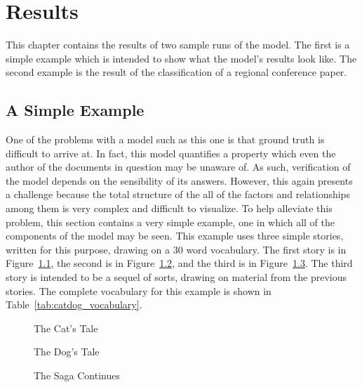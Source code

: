 \documentclass[../ut-dissertation.tex]{subfiles}
\begin{document}
\chapter{Results}
This chapter contains the results of two sample runs of the model.
The first is a simple example which is intended to show what the
model's results look like.  The second example is the result of the
classification of a regional conference paper.

\section{A Simple Example}
One of the problems with a model such as this one is that ground truth
is difficult to arrive at.  In fact, this model quantifies a property
which even the author of the documents in question may be unaware of.
As such, verification of the model depends on the sensibility of its
answers.  However, this again presents a challenge because the total
structure of the all of the factors and relationships among them is
very complex and difficult to visualize.  To help alleviate this
problem, this section contains a very simple example, one in which all
of the components of the model may be seen.  This example uses three
simple stories, written for this purpose, drawing on a 30 word
vocabulary.  The first story is in Figure~\ref{fig:cat_story}, the
second is in Figure~\ref{fig:dog_story}, and the third is in
Figure~\ref{fig:cat_dog_story}.  The third story is intended to be a
sequel of sorts, drawing on material from the previous stories.  The
complete vocabulary for this example is shown in
Table~\ref{tab:catdog_vocabulary}.
\begin{figure}[p]
  \noindent{}
  \caption{The Cat's Tale}\label{fig:cat_story}
\end{figure}

\begin{figure}[p]
  \noindent{}
  \caption{The Dog's Tale}\label{fig:dog_story}
\end{figure}

\begin{figure}[p]
  \noindent{}
  \caption{The Saga Continues}\label{fig:cat_dog_story}
\end{figure}
\end{document}
